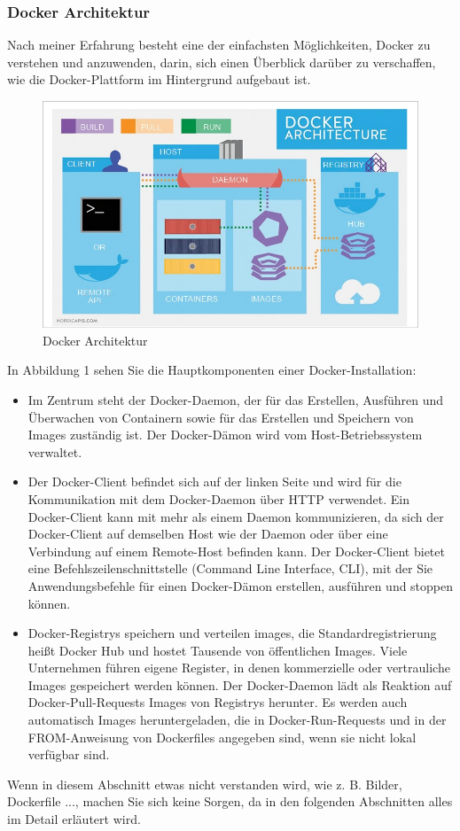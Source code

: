 \documentclass[apaper4,12p]{scrartcl}
\begin{document}
\subsubsection{Docker Architektur}
Nach meiner Erfahrung besteht eine der einfachsten Möglichkeiten, Docker zu verstehen und anzuwenden, darin, sich einen Überblick darüber zu verschaffen, wie die Docker-Plattform im Hintergrund aufgebaut ist.
\newline
\begin{figure}[htp]
	\includegraphics[scale=2]{Figure-1-Docker-container-architecture}
	\caption{Docker Architektur}
	\label{img:grafik-dummy}
\end{figure}
In Abbildung 1 sehen Sie die Hauptkomponenten einer Docker-Installation:
\begin{itemize}
	\item Im Zentrum steht der Docker-Daemon, der für das Erstellen, Ausführen und Überwachen von Containern sowie für das Erstellen und Speichern von Images zuständig ist. Der Docker-Dämon wird vom Host-Betriebssystem verwaltet.
    \item Der Docker-Client befindet sich auf der linken Seite und wird für die Kommunikation mit dem Docker-Daemon über HTTP verwendet. Ein Docker-Client kann mit mehr als einem Daemon kommunizieren, da sich der Docker-Client auf demselben Host wie der Daemon oder über eine Verbindung auf einem Remote-Host befinden kann. Der Docker-Client bietet eine Befehlszeilenschnittstelle (Command Line Interface, CLI), mit der Sie Anwendungsbefehle für einen Docker-Dämon erstellen, ausführen und stoppen können.
    \item Docker-Registrys speichern und verteilen images, die Standardregistrierung heißt Docker Hub und hostet Tausende von öffentlichen Images. Viele Unternehmen führen eigene Register, in denen kommerzielle oder vertrauliche Images gespeichert werden können. Der Docker-Daemon lädt als Reaktion auf Docker-Pull-Requests Images von Registrys herunter. Es werden auch automatisch Images heruntergeladen, die in Docker-Run-Requests und in der FROM-Anweisung von Dockerfiles angegeben sind, wenn sie nicht lokal verfügbar sind.
\end{itemize}
Wenn in diesem Abschnitt etwas nicht verstanden wird, wie z. B. Bilder, Dockerfile ..., machen Sie sich keine Sorgen, da in den folgenden Abschnitten alles im Detail erläutert wird.
\end{document}
